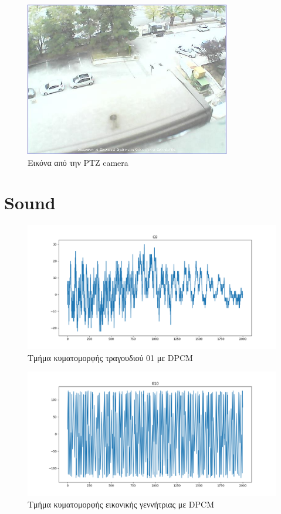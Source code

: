 \documentclass{article}
\begin{document}
\begin{figure}[H]
  \begin{center}
    \includegraphics[width=0.8\textwidth]{../../results/session1/E2.jpg}
  \end{center}
  \caption{Εικόνα από την PTZ camera}
\end{figure}

\section{Sound}

\begin{figure}[H]
  \begin{center}
    \includegraphics[width=\textwidth]{G9.png}
  \end{center}
  \caption{Τμήμα κυματομορφής τραγουδιού 01 με DPCM}
\end{figure}

\begin{figure}[H]
  \begin{center}
    \includegraphics[width=\textwidth]{G10.png}
  \end{center}
  \caption{Τμήμα κυματομορφής εικονικής γεννήτριας με DPCM}
\end{figure}
\end{document}
